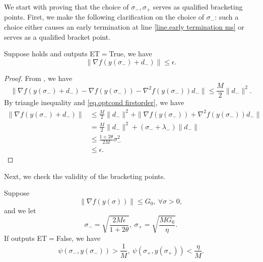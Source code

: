 \documentclass{mcom-l}
\numberwithin{equation}{section}
\begin{document}
We start with proving that the choice of $\sigma_-,\sigma_+$ serves as qualified bracketing points. First, we make the following clarification on the choice of $\sigma_-$: such a choice either causes an early termination at line \ref{line.early termination ms} or serves as a qualified bracket point.
\begin{lemma}
    \label{lem.early termination ms}
    Suppose  holds and  outputs ET$=$True, we have
    \begin{equation*}
        \|\nabla f(y(\sigma_-)+d_-) \|\leq \epsilon.
    \end{equation*}
\end{lemma}
\begin{proof}
    From , we have
    \begin{equation*}
        \|\nabla f(y(\sigma_-)+d_-)-\nabla f(y(\sigma_-))-\nabla^2 f(y(\sigma_-))d_-\|\leq \frac{M}{2}\|d_-\|^2.
    \end{equation*}
    By triangle inequality and \eqref{eq.optcond firstorder}, we have
    \begin{equation*}
        \begin{aligned}
            \|\nabla f(y(\sigma_-)+d_-)\| & \leq \frac{M}{2}\|d_-\|^2+\| \nabla f(y(\sigma_-))+\nabla^2 f(y(\sigma_-))d_-\| \\
                                          & = \frac{M}{2}\|d_-\|^2+(\sigma_-+\lambda_-) \|d_-\|                             \\
                                          & \leq \frac{1+2\theta}{2M}\sigma_-^2                                             \\
                                          & \leq \epsilon.
        \end{aligned}
    \end{equation*}
\end{proof}
Next, we check the validity of the bracketing points.
\begin{lemma}
    \label{lem.bracketing points}
    Suppose
    \begin{equation}\label{eq.bounded gradient y}
        \|\nabla f(y(\sigma))\|\leq G_0, \ \forall \sigma>0,
    \end{equation}
    and we let
    \begin{equation}
        \label{eq.bracket points}
        \sigma_- = \sqrt{\frac{2M\epsilon}{1+2\theta}}, \ \sigma_+ = \sqrt{\frac{MG_0}{\eta}}.
    \end{equation}
    If  outputs ET$=$False, we have
    \begin{equation*}
        \psi\left (\sigma_-,y(\sigma_-)\right) >\frac{1}{M}, \ \psi\left (\sigma_+,y(\sigma_+)\right) <\frac{\eta}{M}.
    \end{equation*}
\end{lemma}
\end{document}
